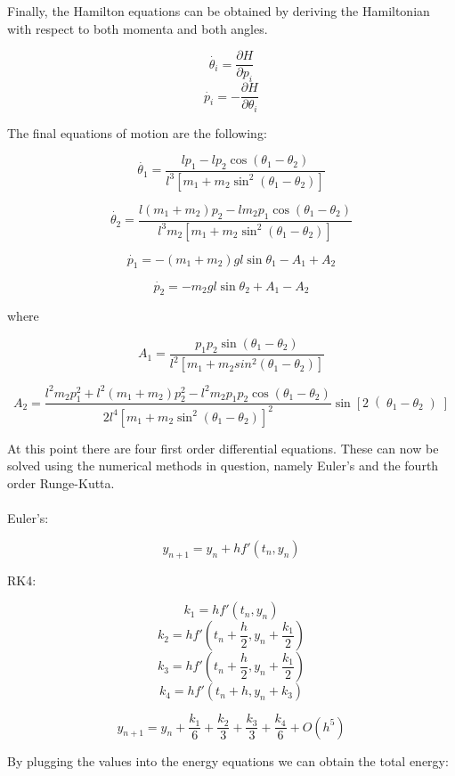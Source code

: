 \documentclass[a4paper,12pt]{article}
\begin{document}
Finally, the Hamilton equations can be obtained by deriving the Hamiltonian
with respect to both momenta and both angles.

\[ \dot{\theta_i} = \frac{\partial H}{\partial p_i} \]
\[ \dot{p_i} = - \frac{\partial H}{\partial \theta_i} \]

The final equations of motion are the following:

\[ \dot{\theta_1} = \frac{l p_1 - l p_2 \cos \left(\theta_1 - \theta_2 \right)}
						 {l^3 \left[ m_1 + m_2 \sin^2 \left( \theta_1 - 
							\theta_2 \right) \right]} \]

\[ \dot{\theta_2} = \frac{l \left(m_1 + m_2\right) p_2 - l m_2 p_1 \cos 
									\left(\theta_1 - \theta_2 \right)}
						 {l^3 m_2 \left[ m_1 + m_2 \sin^2 \left( \theta_1 - 
							\theta_2 \right) \right]} \]

\[ \dot{p_1} = - \left(m_1 + m_2\right) g l \sin \theta_1 - A_1 + A_2\]

\[ \dot{p_2} = - m_2 g l \sin \theta_2 + A_1 - A_2\]

where

\[ A_1 = \frac{p_1 p_2 \sin \left( \theta_1 - \theta_2 \right)}
			  {l^2 \left[m_1 + m_2 sin^2 \left( \theta_1 - \theta_2 \right)\right]} \]
			  
\[ A_2 = \frac{l^2 m_2 p_1^2 + l^2 \left( m_1 + m_2 \right) p_2^2 - l^2 m_2 p_1 p_2 
					\cos \left( \theta_1 - \theta_2 \right)}
			  {2 l^4 \left[ m_1 + m_2 \sin^2 \left( \theta_1 - 
					\theta_2 \right)\right]^2}
		 \sin \left[ 2 \right( \theta_1 - \theta_2 \left) \right] \]

At this point there are four first order differential equations. These can
now be solved using the numerical methods in question, namely Euler's and
the fourth order Runge-Kutta. \\ \\
\indent Euler's:

\[ y_{n+1} = y_n + h f' \left( t_n, y_n \right)\]

RK4:

\[ k_1 = h f' \left(t_n, y_n \right) \]
\[ k_2 = h f' \left(t_n + \frac{h}{2}, y_n + \frac{k_1}{2} \right) \]
\[ k_3 = h f' \left(t_n + \frac{h}{2}, y_n + \frac{k_1}{2} \right) \]
\[ k_4 = h f' \left(t_n + h, y_n + k_3 \right) \]

\[ y_{n+1} = y_n + \frac{k_1}{6} + \frac{k_2}{3} + \frac{k_3}{3} + 
					\frac{k_4}{6} + O \left( h^5 \right)\]

By plugging the values into the energy equations we can obtain the total
energy:
\end{document}
